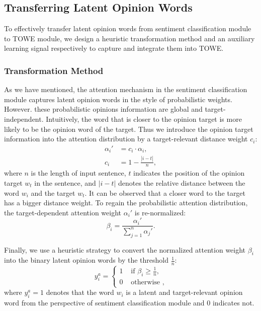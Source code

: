 \documentclass[letterpaper]{article} \usepackage{aaai20}  \usepackage{times}  \usepackage{helvet} \usepackage{courier}  \usepackage[hyphens]{url}  \usepackage{graphicx} \urlstyle{rm} \def\UrlFont{\rm}  \usepackage{graphicx}
\begin{document}
\subsection{Transferring  Latent Opinion Words}
To effectively transfer latent opinion words from sentiment classification module to TOWE module, we design a heuristic transformation method and an auxiliary learning signal respectively to capture and integrate them into TOWE.
\subsubsection{Transformation Method}
As we have mentioned, the attention mechanism in the sentiment classification module captures latent opinion words in the style of probabilistic weights. However. these probabilistic opinions information are global and target-independent. Intuitively, the word that is closer to the opinion target is more likely to be the opinion word of the target. Thus we introduce the opinion target information into the attention distribution by a target-relevant distance weight $c_i$:
\begin{align}
	\alpha_i{'} &= c_i \cdot \alpha_i, \\
	c_i &= 1 - \frac{|i-t|}{n},
\end{align}
where $n$ is the length of input sentence, $t$ indicates the position of the opinion target $w_t$ in the sentence, and $|i-t|$ denotes the relative distance between the word $w_i$ and the target $w_t$. It can be observed that a closer word to the target has a bigger distance weight. To regain the probabilistic attention distribution, the target-dependent attention weight $\alpha_i{'}$ is re-normalized:
\begin{equation}
	\beta_i=\frac{\alpha_i{'}}{\sum_{j=1}^{n}\alpha_j{'}}.
\end{equation}

Finally, we use a heuristic strategy to convert the normalized attention weight $\beta_i$ into the binary latent opinion words by the threshold $\frac{1}{n}$:
\begin{equation}
	y^a_i=\begin{cases}
		1 & \text{ if } \beta_i \geq  \frac{1}{n}, \\ 
		0 & \text{ otherwise }, 
	\end{cases}
\end{equation}
where $y^a_i=1$ denotes that the word $w_i$ is a latent and target-relevant opinion word from the perspective of sentiment classification module and $0$ indicates not.
\end{document}

